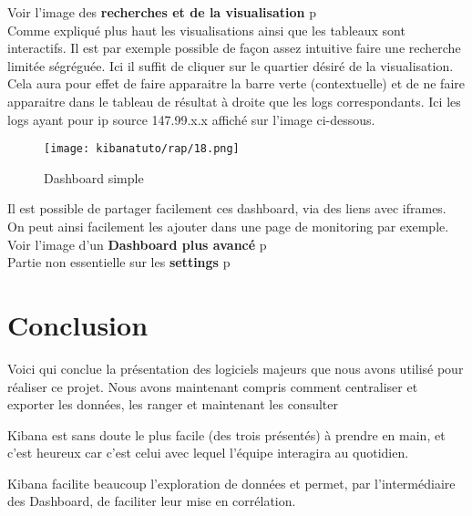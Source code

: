     Voir l'image des \textbf{recherches et de la visualisation} p\pageref{fig:kibanatuto10}\\[2mm]
Comme expliqué plus haut les visualisations ainsi que les tableaux sont interactifs.
Il est par exemple possible de façon assez intuitive faire une recherche limitée ségréguée.
Ici il suffit de cliquer sur le quartier désiré de la visualisation. Cela aura pour 
effet de faire apparaitre la barre verte (contextuelle) et de ne faire apparaitre 
dans le tableau de résultat à droite que les logs correspondants. Ici les logs ayant
pour ip source 147.99.x.x affiché sur l'image ci-dessous.

\begin{figure}[H]
\center
\texttt{[image: kibanatuto/rap/18.png]}
\label{fig:kibanatuto11}
\caption{Dashboard simple}
\end{figure}

Il est possible de partager facilement ces dashboard, via des liens avec 
iframes. On peut ainsi facilement les ajouter dans une page de monitoring par exemple.\\[2mm]
Voir l'image d'un \textbf{Dashboard plus avancé} p\pageref{fig:kibanatuto12}\\[2mm]
Partie non essentielle sur les \textbf{settings} p\pageref{subsec:settings}

\section{Conclusion}
Voici qui conclue la présentation des logiciels majeurs que nous avons
utilisé pour réaliser ce projet. Nous avons maintenant compris comment
centraliser et exporter les données, les ranger et maintenant les consulter

Kibana est sans doute le plus facile (des trois présentés) à prendre en main, et c'est heureux 
car c'est celui avec lequel l'équipe interagira au quotidien.

Kibana facilite beaucoup l'exploration de données et permet, par l'intermédiaire des Dashboard,  de faciliter leur mise en corrélation.
